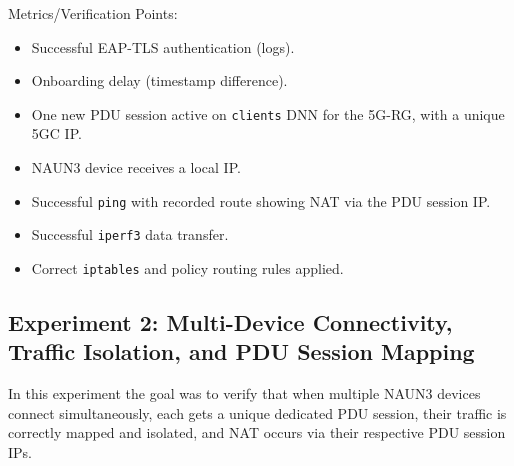 Metrics/Verification Points:
\begin{itemize}
    \item Successful \ac{EAP-TLS} authentication (logs).
    \item Onboarding delay (timestamp difference).
    \item One new \ac{PDU} session active on \texttt{clients} \ac{DNN} for the \ac{5G-RG}, with a unique \ac{5GC} \ac{IP}.
    \item \ac{NAUN3} device receives a local \ac{IP}.
    \item Successful \texttt{ping} with recorded route showing \ac{NAT} via the \ac{PDU} session IP.
    \item Successful \texttt{iperf3} data transfer.
    \item Correct \texttt{iptables} and policy routing rules applied.
\end{itemize}

\subsection{Experiment 2: Multi-Device Connectivity, Traffic Isolation, and \acs{PDU} Session Mapping}

In this experiment the goal was to verify that when multiple \ac{NAUN3} devices connect simultaneously, each gets a unique dedicated \ac{PDU} session, their traffic is correctly mapped and isolated, and \ac{NAT} occurs via their respective \ac{PDU} session \acp{IP}.

